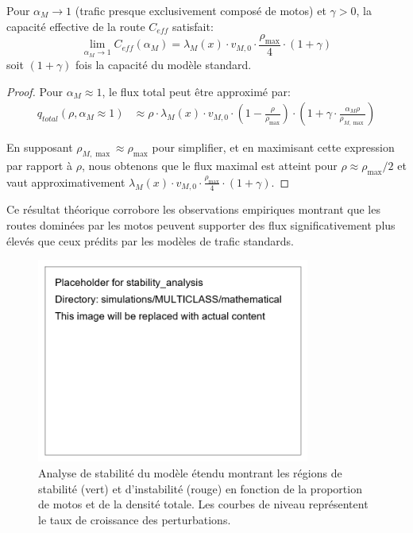 \begin{theorem}
Pour $\alpha_M \to 1$ (trafic presque exclusivement composé de motos) et $\gamma > 0$, la capacité effective de la route $C_{eff}$ satisfait:
\begin{equation}
\lim_{\alpha_M \to 1} C_{eff}(\alpha_M) = \lambda_M(x) \cdot v_{M,0} \cdot \frac{\rho_{\max}}{4} \cdot (1 + \gamma)
\end{equation}
soit $(1 + \gamma)$ fois la capacité du modèle standard.
\end{theorem}

\begin{proof}
Pour $\alpha_M \approx 1$, le flux total peut être approximé par:
\begin{align}
q_{total}(\rho, \alpha_M \approx 1) &\approx \rho \cdot \lambda_M(x) \cdot v_{M,0} \cdot \left(1 - \frac{\rho}{\rho_{\max}}\right) \cdot \left(1 + \gamma \cdot \frac{\alpha_M \rho}{\rho_{M,\max}}\right)
\end{align}

En supposant $\rho_{M,\max} \approx \rho_{\max}$ pour simplifier, et en maximisant cette expression par rapport à $\rho$, nous obtenons que le flux maximal est atteint pour $\rho \approx \rho_{\max}/2$ et vaut approximativement $\lambda_M(x) \cdot v_{M,0} \cdot \frac{\rho_{\max}}{4} \cdot (1 + \gamma)$.
\end{proof}

Ce résultat théorique corrobore les observations empiriques montrant que les routes dominées par les motos peuvent supporter des flux significativement plus élevés que ceux prédits par les modèles de trafic standards.

\begin{figure}[htbp]
\centering
\includegraphics[width=0.8\textwidth]{simulations/MULTICLASS/mathematical/stability_analysis}
\caption{Analyse de stabilité du modèle étendu montrant les régions de stabilité (vert) et d'instabilité (rouge) en fonction de la proportion de motos et de la densité totale. Les courbes de niveau représentent le taux de croissance des perturbations.}
\label{fig:stability_analysis_extension}
\end{figure}
